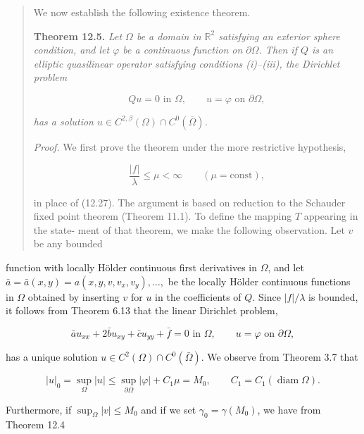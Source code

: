 \begin{quote}
We now establish the following existence theorem.

\textbf{Theorem 12.5.} \textit{Let $\Omega$ be a domain in $\mathbb{R}^2$ satisfying an exterior sphere condition,
and let $\varphi$ be a continuous function on $\partial\Omega$. Then if $Q$ is an elliptic quasilinear operator
satisfying conditions (i)--(iii), the Dirichlet problem}

\begin{equation}\tag{12.29}
Qu=0\text{ in }\Omega,\qquad u=\varphi\text{ on }\partial\Omega,
\end{equation}

\textit{has a solution $u\in C^{2,\beta}(\Omega)\cap C^0(\overline{\Omega})$.}

\textit{Proof.} We first prove the theorem under the more restrictive hypothesis,

\begin{equation}\tag{12.30}
\frac{|f|}{\lambda}\le \mu<\infty\qquad (\mu=\text{const}),
\end{equation}

in place of (12.27). The argument is based on reduction to the Schauder fixed
point theorem (Theorem 11.1). To define the mapping $T$ appearing in the state-
ment of that theorem, we make the following observation. Let $v$ be any bounded
\end{quote}


function with locally H\"older continuous first derivatives in $\Omega$, and let $\bar a=\bar a(x, y)=a(x, y, v, v_x, v_y), \ldots,$ be the locally H\"older continuous functions in $\Omega$ obtained by inserting $v$ for $u$ in the coefficients of $Q$. Since $|f|/\lambda$ is bounded, it follows from Theorem 6.13 that the linear Dirichlet problem,

\begin{equation}
\tag{12.31}
\bar a u_{xx}+2\bar b u_{xy}+\bar c u_{yy}+\bar f=0 \text{ in } \Omega,\qquad u=\varphi \text{ on } \partial\Omega,
\end{equation}

has a unique solution $u\in C^2(\Omega)\cap C^0(\bar\Omega)$. We observe from Theorem 3.7 that

\[
|u|_0=\sup_{\Omega}|u|\leq \sup_{\partial\Omega}|\varphi|+C_1\mu=M_0,\qquad C_1=C_1(\operatorname{diam}\Omega).
\]

Furthermore, if $\sup_{\Omega}|v|\leq M_0$ and if we set $\gamma_0=\gamma(M_0)$, we have from Theorem 12.4

